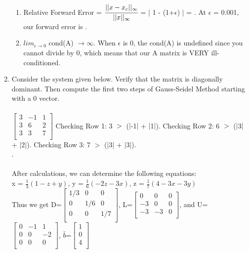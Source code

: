\documentclass[12pt]{article}
\begin{document}
\begin{enumerate}
\begin{enumerate}
\item Relative Forward Error = $\cfrac{||x - x_c||_{\infty}}{||x||_{\infty}}$ = $|$ 1 - (1+$\epsilon$) $|$ = \fbox{$\epsilon$}. At $\epsilon$ = 0.001, our forward error is .
\item $lim_{\epsilon \rightarrow 0}$ cond(A) $\rightarrow \infty$. When $\epsilon$ is 0, the cond(A) is undefined since you cannot divide by 0, which means that our A matrix is VERY ill-conditioned. \\
	\end{enumerate}
\item Consider the system given below. Verify that the matrix is diagonally dominant. Then compute the first two steps of Gauss-Seidel Method starting with a 0 vector. \\ \\
$\begin{bmatrix}
   3 & -1 & 1 \\
   3 & 6 & 2 \\
   3 & 3 & 7 \\
\end{bmatrix}$ \tabto{2.5cm} Checking Row 1: 3 $>$ ($|$-1$|$ + $|$1$|$). Checking Row 2: 6 $>$ ($|$3$|$ + $|$2$|$). 
\tabto{2.5cm} Checking Row 3: 7 $>$ ($|$3$|$ + $|$3$|$). \\
. \\ \\
After calculations, we can determine the following equations: \\
x = $\frac{1}{3}(1-z+y)$, y = $\frac{1}{6}(-2z-3x)$, z = $\frac{1}{7}(4-3x-3y)$\\
Thus we get D=$\begin{bmatrix}
   1/3 & 0 & 0 \\
   0 & 1/6 & 0 \\
   0 & 0 & 1/7 \\
\end{bmatrix}$, L=$\begin{bmatrix}
   0 & 0 & 0 \\
   -3 & 0 & 0 \\
   -3 & -3 & 0 \\
\end{bmatrix}$, and U=$\begin{bmatrix}
   0 & -1 & 1 \\
   0 & 0 & -2 \\
   0 & 0 & 0 \\
\end{bmatrix}$, $\bar{b}$=$\begin{bmatrix}
   1\\
   0\\
   4\\
\end{bmatrix}$ \pagebreak


\end{enumerate}
\end{document}
